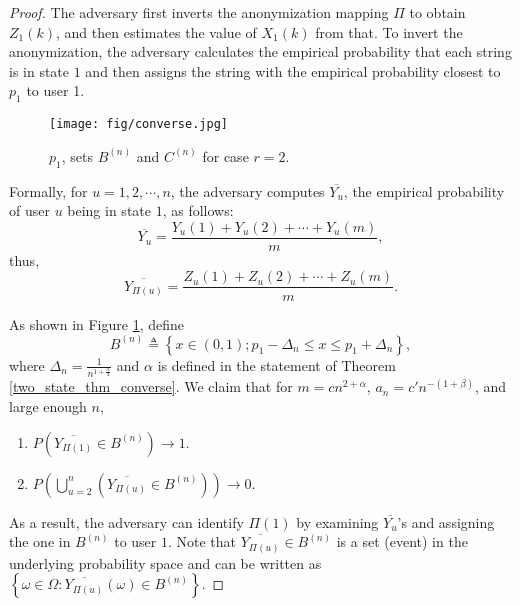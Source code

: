\begin{proof}
The adversary first inverts the anonymization mapping $\Pi$ to obtain $Z_1(k)$, and then estimates the value of $X_1(k)$ from that. To invert the anonymization, the adversary calculates the empirical probability that each string is in state $1$ and then assigns the string with the empirical probability closest to $p_1$ to user 1.

\begin{figure}
	\centering
	\texttt{[image: fig/converse.jpg]}
	\centering
	\caption{$p_1$, sets $B^{(n)}$ and $C^{(n)}$ for case $r=2$.}
	\label{fig:converse}
\end{figure}


Formally, for $u=1, 2, \cdots, n$, the adversary computes $\overline{Y_u}$, the empirical probability of user $u$ being in state $1$, as follows:
\[
\overline{Y_u}=\frac{Y_u(1)+Y_u(2)+ \cdots +Y_u(m)}{m},
\]
thus,
\[
\overline{Y_{\Pi(u)}}=\frac{Z_u(1)+Z_u(2)+ \cdots +Z_u(m)}{m}.
\]

As shown in Figure \ref{fig:converse}, define
\[B^{(n)}\triangleq \left\{x \in (0,1); p_1-\Delta_n \leq x \leq p_1+\Delta_n\right\},\]
where $\Delta_n = \frac{1}{n^{1+\frac{\alpha}{4}}}$ and $\alpha $ is defined in the statement of Theorem \ref{two_state_thm_converse}. We claim that for $m =cn^{2 +  \alpha}$, $a_n=c'n^{-(1 +  \beta)}$, and large enough $n$,
\begin{enumerate}
\item $P\left( \overline{Y_{\Pi(1) }}\in B^{(n)}\right) \rightarrow 1.$
\item $P\left( \bigcup\limits_{u=2}^{n} \left(\overline{Y_{\Pi(u)}}\in B^{(n)}\right)\right) \rightarrow 0.$
\end{enumerate}
As a result, the adversary can identify $\Pi(1)$ by examining  $\overline{Y_u}$'s and assigning the one in $B^{(n)}$ to user $1$. Note that $\overline{Y_{\Pi(u) }} \in B^{(n)}$ is a set (event) in the underlying probability space and can be written as $\left\{\omega \in \Omega: \overline{Y_{\Pi(u) }}(\omega) \in B^{(n)}\right\}$.


\end{proof}
